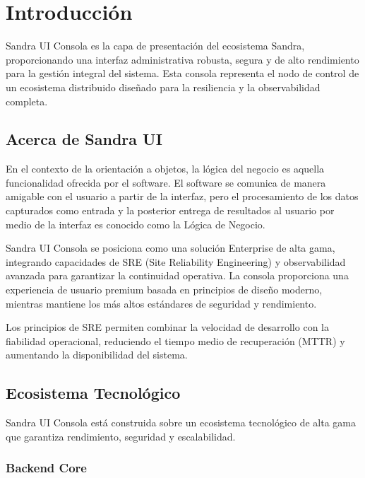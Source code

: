 
\chapter{Introducción}

Sandra UI Consola es la capa de presentación del ecosistema Sandra, proporcionando una interfaz administrativa robusta, segura y de alto rendimiento para la gestión integral del sistema. Esta consola representa el nodo de control de un ecosistema distribuido diseñado para la resiliencia y la observabilidad completa.

\section{Acerca de Sandra UI}

En el contexto de la orientación a objetos, la lógica del negocio es aquella funcionalidad ofrecida por el software. El software se comunica de manera amigable con el usuario a partir de la interfaz, pero el procesamiento de los datos capturados como entrada y la posterior entrega de resultados al usuario por medio de la interfaz es conocido como la Lógica de Negocio.

Sandra UI Consola se posiciona como una solución Enterprise de alta gama, integrando capacidades de SRE (Site Reliability Engineering) y observabilidad avanzada para garantizar la continuidad operativa. La consola proporciona una experiencia de usuario premium basada en principios de diseño moderno, mientras mantiene los más altos estándares de seguridad y rendimiento.

Los principios de SRE permiten combinar la velocidad de desarrollo con la fiabilidad operacional, reduciendo el tiempo medio de recuperación (MTTR) y aumentando la disponibilidad del sistema.

\section{Ecosistema Tecnológico}

Sandra UI Consola está construida sobre un ecosistema tecnológico de alta gama que garantiza rendimiento, seguridad y escalabilidad.

\subsection{Backend Core}

